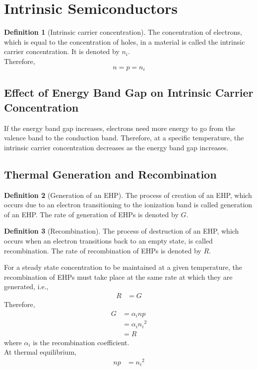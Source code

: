 \documentclass[titlepage, fleqn, a4paper, 12pt, twoside]{article}
\theoremstyle{definition}
\newtheorem{definition}{Definition}
\theoremstyle{theorem}
\let\Oldsection\section
\renewcommand{\section}{\FloatBarrier\Oldsection}
\let\Oldsubsection\subsection
\renewcommand{\subsection}{\FloatBarrier\Oldsubsection}
\begin{document}
\section{Intrinsic Semiconductors}

\begin{definition}[Intrinsic carrier concentration]
	The concentration of electrons, which is equal to the concentration of holes, in a material is called the intrinsic carrier concentration.
	It is denoted by $n_i$.\\
	Therefore,
	\begin{equation*}
		n = p = n_i
	\end{equation*}
\end{definition}

\subsection{Effect of Energy Band Gap on Intrinsic Carrier Concentration}

If the energy band gap increases, electrons need more energy to go from the valence band to the conduction band.
Therefore, at a specific temperature, the intrinsic carrier concentration decreases as the energy band gap increases.

\subsection{Thermal Generation and Recombination}

\begin{definition}[Generation of an EHP]
	The process of creation of an EHP, which occurs due to an electron transitioning to the ionization band is called generation of an EHP.
	The rate of generation of EHPs is denoted by $G$.
\end{definition}

\begin{definition}[Recombination]
	The process of destruction of an EHP, which occurs when an electron transitions back to an empty state, is called recombination.
	The rate of recombination of EHPs is denoted by $R$.
\end{definition}

For a steady state concentration to be maintained at a given temperature, the recombination of EHPs must take place at the same rate at which they are generated, i.e.,
\begin{align*}
	R &= G
\end{align*}
Therefore,
\begin{align*}
	G &= \alpha_i n p\\
	&= \alpha_i {n_i}^2\\
	&= R
\end{align*}
where $\alpha_i$ is the recombination coefficient.\\
At thermal equilibrium,
\begin{align*}
	n p &= {n_i}^2
\end{align*}
\end{document}
